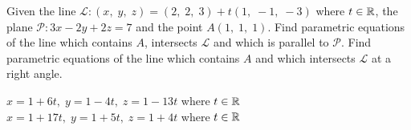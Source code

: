 
\begin{Exercise}[
name={},
title={}, 
difficulty=0,
origin={\cite{BS}}]
Given the line $\mathcal{L}: (x,\; y,\; z) = (2,\; 2,\; 3) + t(1,\; -1,\; -3)$ where $t\in\mathbb{R}$, the plane $\mathcal{P}: 3x - 2y + 2z = 7$ and the point $A(1,\; 1,\; 1)$.
\Question Find parametric equations of the line which contains $A$, 
intersects $\mathcal{L}$ and which is parallel to $\mathcal{P}$.
\Question Find parametric equations of the line which contains $A$ and which intersects $\mathcal{L}$ at a right angle.
\end{Exercise}
\begin{Answer}
\Question $x=1+6t,\;y=1-4t,\;z=1-13t$ where $t\in\mathbb{R}$
\Question $x=1+17t,\;y=1+5t,\;z=1+4t$ where $t\in\mathbb{R}$
\end{Answer}
